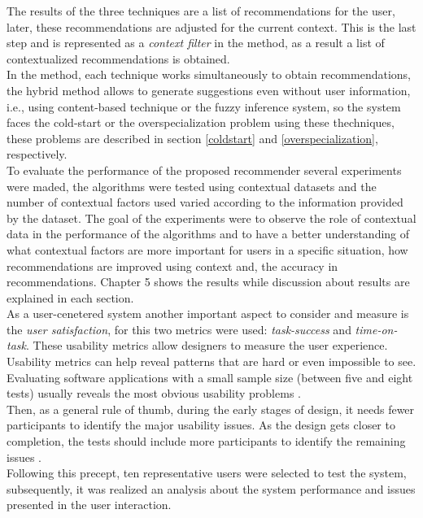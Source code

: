 The results of the three techniques are a list of recommendations for
the user, later, these recommendations are adjusted for the current context.
This is the last step and is represented as a \textit{context filter} in the
method, as a result a list of contextualized
recommendations is obtained. \\
In the method, each technique works simultaneously to obtain
recommendations, the hybrid method allows to generate suggestions even
without user information, i.e., using content-based technique or the
fuzzy inference system, so the system faces the cold-start or the
overspecialization problem using these thechniques, these problems are
described in section \ref{coldstart} and 
 \ref{overspecialization}, respectively.\\
To evaluate the performance of the proposed recommender several experiments
were maded, the algorithms were tested using contextual datasets and
the number of contextual factors used varied according to the information
provided by the dataset. The goal of the experiments were to observe
the role of contextual data  in the performance of the algorithms and to 
have a better understanding of what contextual
factors are more important for users in a specific situation, how recommendations
are improved using context and, the accuracy in recommendations.
Chapter 5 shows the results while discussion about results are
explained in each section.\\
As a user-cenetered system another important aspect 
to consider and measure is the \textit{user satisfaction}, for this two
metrics were used: \textit{task-success} and \textit
{time-on-task}. These usability metrics allow designers to measure 
the user experience.
\\ Usability
metrics can help reveal patterns that are hard or even impossible to
see. Evaluating software applications with a small sample size 
(between five and eight tests) usually reveals the most obvious 
usability problems \cite{albert2013measuring}.\\ 
Then, as a general rule of thumb, during the early stages of design, 
it needs fewer participants to identify the major usability issues. 
As the design gets closer to completion, the tests should include more
participants to identify the remaining issues \cite{albert2013measuring}.\\ 
Following this precept, ten representative users were selected to test
the system, subsequently, it was realized an analysis about the system
performance and issues presented in the user interaction. 

